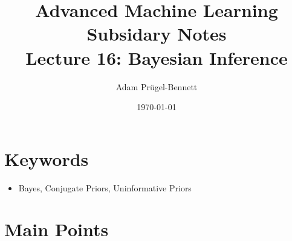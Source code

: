 \documentclass[11pt]{article}
\author{Adam Prügel-Bennett}
\date{\today}
\title{Advanced Machine Learning Subsidary Notes\\\medskip
\large Lecture 16: Bayesian Inference}
\begin{document}
\maketitle

\section{Keywords}
\label{sec:org8833a8b}
\begin{itemize}
\item Bayes, Conjugate Priors, Uninformative Priors
\end{itemize}

\section{Main Points}
\label{sec:org4941a69}
\end{document}
